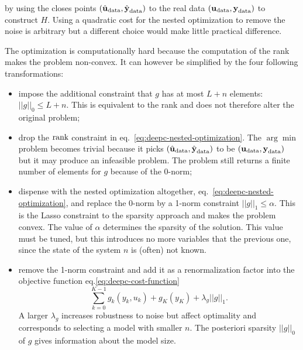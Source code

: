 by using the closes points $(\hat{\boldsymbol{\mathrm{u}}}_\textrm{data},\hat{\boldsymbol{\mathrm{y}}}_\textrm{data})$ to the real data $(\boldsymbol{\mathrm{u}}_\textrm{data},\boldsymbol{\mathrm{y}}_\textrm{data})$ to construct $H$. Using a quadratic cost for the nested optimization to remove the noise is arbitrary but a different choice would make little practical difference.

The optimization is computationally hard because the computation of the rank makes the problem non-convex. It can however be simplified by the four following transformations:
\begin{itemize}
\item impose the additional constraint that $g$ has at most $L+n$ elements: $||g||_0\le L+n$. This is equivalent to the rank and does not therefore alter the original problem;
\item drop the $\textrm{rank}$ constraint in eq.~\eqref{eq:deepc-nested-optimization}. The $\arg \min$ problem becomes trivial because it picks $(\hat{\boldsymbol{\mathrm{u}}}_\textrm{data},\hat{\boldsymbol{\mathrm{y}}}_\textrm{data})$ to be $(\boldsymbol{\mathrm{u}}_\textrm{data},\boldsymbol{\mathrm{y}}_\textrm{data})$ but it may produce an infeasible problem. The problem still returns a finite number of elements for $g$ because of the 0-norm;
\item dispense with the nested optimization altogether, eq.~\eqref{eq:deepc-nested-optimization}, and replace the 0-norm by a 1-norm constraint $||g||_1\le \alpha$. This is the Lasso constraint to the sparsity approach and makes the problem convex. The value of $\alpha$ determines the sparsity of the solution. This value must be tuned, but this introduces no more variables that the previous one, since the state of the system $n$ is (often) not known.
\item remove the 1-norm constraint and add it as a renormalization factor into the objective function eq.\eqref{eq:deepc-cost-function}
  \begin{equation*}
    \sum_{k=0}^{K-1} g_k(y_k,u_k) + g_K(y_K) + \lambda_g||g||_1.
  \end{equation*}
  A larger $\lambda_g$ increases robustness to noise but affect optimality and corresponds to selecting a model with smaller $n$. The posteriori sparsity $||g||_0$ of $g$ gives information about the model size.
\end{itemize}

